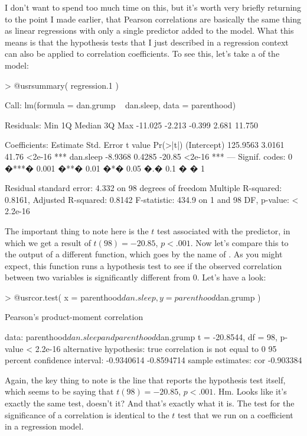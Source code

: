 
I don't want to spend too much time on this, but it's worth very briefly returning to the point I made earlier, that Pearson correlations are basically the same thing as linear regressions with only a single predictor added to the model. What this means is that the hypothesis tests that I just described in a regression context can also be applied to correlation coefficients. To see this, let's take a  of the  model:
\begin{rblock1}
> @usr{summary( regression.1 )}

Call:
lm(formula = dan.grump ~ dan.sleep, data = parenthood)

Residuals:
    Min      1Q  Median      3Q     Max 
-11.025  -2.213  -0.399   2.681  11.750 

Coefficients:
            Estimate Std. Error t value Pr(>|t|)    
(Intercept) 125.9563     3.0161   41.76   <2e-16 ***
dan.sleep    -8.9368     0.4285  -20.85   <2e-16 ***
---
Signif. codes:  0 �***� 0.001 �**� 0.01 �*� 0.05 �.� 0.1 � � 1 

Residual standard error: 4.332 on 98 degrees of freedom
Multiple R-squared: 0.8161,	Adjusted R-squared: 0.8142 
F-statistic: 434.9 on 1 and 98 DF,  p-value: < 2.2e-16 
\end{rblock1}
The important thing to note here is the $t$ test associated with the predictor, in which we get a result of $t(98) = -20.85$, $p<.001$. Now let's compare this to the output of a different function, which goes by the name of . As you might expect, this function runs a hypothesis test to see if the observed correlation between two variables is significantly different from 0. Let's have a look:
\begin{rblock1}
> @usr{cor.test( x = parenthood$dan.sleep, y = parenthood$dan.grump )}

	Pearson's product-moment correlation

data:  parenthood$dan.sleep and parenthood$dan.grump 
t = -20.8544, df = 98, p-value < 2.2e-16
alternative hypothesis: true correlation is not equal to 0 
95 percent confidence interval:
 -0.9340614 -0.8594714 
sample estimates:
      cor 
-0.903384 
\end{rblock1}
Again, the key thing to note is the line that reports the hypothesis test itself, which seems to be saying that $t(98) = -20.85$, $p<.001$. Hm. Looks like it's exactly the same test, doesn't it? And that's exactly what it is. The test for the significance of a correlation is identical to the $t$ test that we run on a coefficient in a regression model. 


